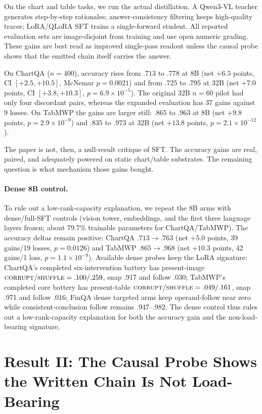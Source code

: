 \documentclass[11pt]{article}
\newcommand{\corrupt}{\textsc{corrupt}}
\newcommand{\shuffle}{\textsc{shuffle}}
\begin{document}
On the chart and table tasks, we run the actual distillation. A Qwen3-VL teacher generates step-by-step rationales; answer-consistency filtering keeps high-quality traces; LoRA/QLoRA SFT trains a single-forward student. All reported evaluation sets are image-disjoint from training and use open numeric grading. These gains are best read as improved single-pass readout unless the causal probe shows that the emitted chain itself carries the answer.

On ChartQA ($n{=}400$), accuracy rises from $.713$ to $.778$ at 8B (net $+6.5$ points, CI $[+2.5,+10.5]$, McNemar $p{=}0.0021$) and from $.725$ to $.795$ at 32B (net $+7.0$ points, CI $[+3.8,+10.3]$, $p{=}6.9{\times}10^{-5}$). The original 32B $n{=}60$ pilot had only four discordant pairs, whereas the expanded evaluation has 37 gains against 9 losses. On TabMWP the gains are larger still: $.865$ to $.963$ at 8B (net $+9.8$ points, $p{=}2.9{\times}10^{-9}$) and $.835$ to $.973$ at 32B (net $+13.8$ points, $p{=}2.1{\times}10^{-12}$).

The paper is not, then, a null-result critique of SFT. The accuracy gains are real, paired, and adequately powered on static chart/table substrates. The remaining question is what mechanism those gains bought.

\paragraph{Dense 8B control.}
To rule out a low-rank-capacity explanation, we repeat the 8B arms with dense/full-SFT controls (vision tower, embeddings, and the first three language layers frozen; about 79.7\% trainable parameters for ChartQA/TabMWP). The accuracy deltas remain positive: ChartQA $.713\!\to\!.763$ (net $+5.0$ points, 39 gains/19 losses, $p{=}0.0126$) and TabMWP $.865\!\to\!.968$ (net $+10.3$ points, 42 gains/1 loss, $p{=}1.1{\times}10^{-9}$). Available dense probes keep the LoRA signature: ChartQA's completed six-intervention battery has present-image $\corrupt{}/\shuffle{}=.100/.259$, snap .917 and follow .030; TabMWP's completed core battery has present-table $\corrupt{}/\shuffle{}=.049/.161$, snap .971 and follow .016; FinQA dense targeted arms keep operand-follow near zero while consistent-conclusion follow remains .947--.982. The dense control thus rules out a low-rank-capacity explanation for both the accuracy gain and the non-load-bearing signature.

\section{Result II: The Causal Probe Shows the Written Chain Is Not Load-Bearing}
\label{sec:probe}
\end{document}
